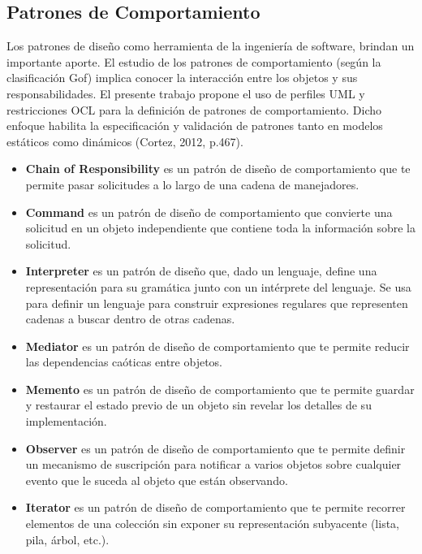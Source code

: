\documentclass{article}
\begin{document}
\begin{multicols}{2}
\subsection{Patrones de Comportamiento}
Los patrones de diseño como herramienta de la ingeniería de software, brindan un importante aporte. El estudio de los patrones de comportamiento (según la clasificación Gof) implica conocer la interacción entre los objetos y sus responsabilidades. El presente trabajo propone el uso de perfiles UML y restricciones OCL para la definición de patrones de comportamiento. Dicho enfoque habilita la especificación y validación de patrones tanto en modelos estáticos como dinámicos (Cortez, 2012, p.467).

\begin{itemize}
 \item \textbf{Chain of Responsibility} es un patrón de diseño de comportamiento que te permite pasar solicitudes a lo largo de una cadena de manejadores.
 
 \item \textbf{Command} es un patrón de diseño de comportamiento que convierte una solicitud en un objeto independiente que contiene toda la información sobre la solicitud.
 
  \item \textbf{Interpreter} es un patrón de diseño que, dado un lenguaje, define una representación para su gramática junto con un intérprete del lenguaje. Se usa para definir un lenguaje para construir expresiones regulares que
representen cadenas a buscar dentro de otras cadenas.
  
  \item \textbf{Mediator} es un patrón de diseño de comportamiento que te permite reducir las dependencias caóticas entre objetos.
   
  \item \textbf{Memento} es un patrón de diseño de comportamiento que te permite guardar y restaurar el estado previo de un objeto sin revelar los detalles de su implementación.
    
    \item \textbf{Observer} es un patrón de diseño de comportamiento que te permite definir un mecanismo de suscripción para notificar a varios objetos sobre cualquier evento que le suceda al objeto que están observando.

    \item \textbf{Iterator} es un patrón de diseño de comportamiento que te permite recorrer elementos de una colección sin exponer su representación subyacente (lista, pila, árbol, etc.).
    

\end{itemize}
\end{multicols}
\end{document}

